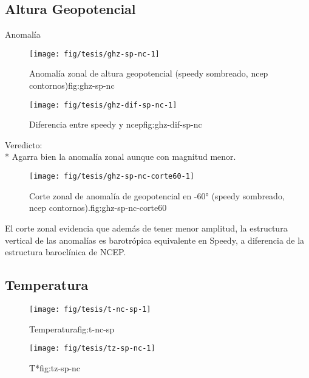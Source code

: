 \documentclass[spanish,a4paper]{book}
\begin{document}
\subsection{Altura Geopotencial}\label{altura-geopotencial-1}

Anomalía

\begin{figure}

{\centering \texttt{[image: fig/tesis/ghz-sp-nc-1]} 

}

\caption{Anomalía zonal de altura geopotencial (speedy sombreado, ncep contornos){fig:ghz-sp-nc}}\label{fig:ghz-sp-nc}
\end{figure}

\begin{figure}

{\centering \texttt{[image: fig/tesis/ghz-dif-sp-nc-1]} 

}

\caption{Diferencia entre speedy y ncep{fig:ghz-dif-sp-nc}}\label{fig:ghz-dif-sp-nc}
\end{figure}

Veredicto:\\
* Agarra bien la anomalía zonal aunque con magnitud menor.

\begin{figure}

{\centering \texttt{[image: fig/tesis/ghz-sp-nc-corte60-1]} 

}

\caption{Corte zonal de anomalía de geopotencial en -60° (speedy sombreado, ncep contornos).{fig:ghz-sp-nc-corte60}}\label{fig:ghz-sp-nc-corte60}
\end{figure}

El corte zonal evidencia que además de tener menor amplitud, la
estructura vertical de las anomalías es barotrópica equivalente en
Speedy, a diferencia de la estructura baroclínica de NCEP.

\subsection{Temperatura}\label{temperatura-1}

\begin{figure}
\texttt{[image: fig/tesis/t-nc-sp-1]} \caption{Temperatura{fig:t-nc-sp}}\label{fig:t-nc-sp}
\end{figure}

\begin{figure}
\texttt{[image: fig/tesis/tz-sp-nc-1]} \caption{T*{fig:tz-sp-nc}}\label{fig:tz-sp-nc}
\end{figure}
\end{document}
